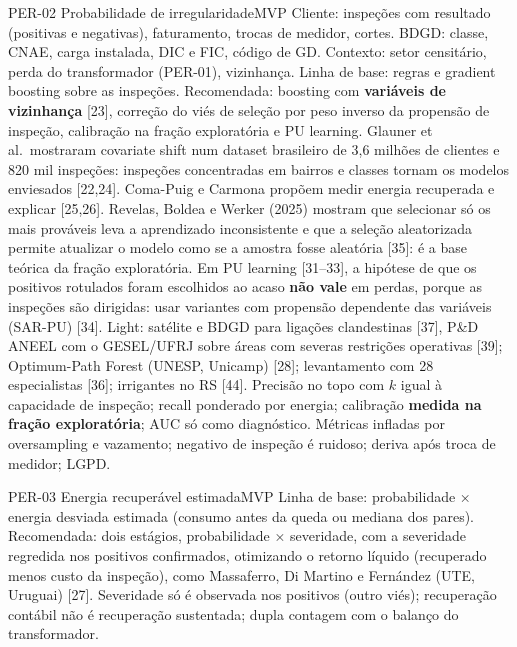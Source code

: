 \begin{ficha}{PER-02 \textperiodcentered{} Probabilidade de irregularidade}{MVP}
 Cliente: inspeções com resultado (positivas e negativas),
faturamento, trocas de medidor, cortes. BDGD: classe, CNAE, carga instalada,
DIC e FIC, código de GD. Contexto: setor censitário, perda do transformador
(PER-01), vizinhança.
 Linha de base: regras e gradient boosting sobre as
inspeções. Recomendada: boosting com \textbf{variáveis de vizinhança} [23],
correção do viés de seleção por peso inverso da propensão de inspeção,
calibração na fração exploratória e PU learning.
 Glauner et al.\ mostraram covariate shift num
dataset brasileiro de 3,6 milhões de clientes e 820 mil inspeções: inspeções
concentradas em bairros e classes tornam os modelos enviesados [22,24].
Coma-Puig e Carmona propõem medir energia recuperada e explicar [25,26].
Revelas, Boldea e Werker (2025) mostram que selecionar só os mais prováveis
leva a aprendizado inconsistente e que a seleção aleatorizada permite
atualizar o modelo como se a amostra fosse aleatória [35]: é a base teórica
da fração exploratória. Em PU learning [31--33], a hipótese de que os
positivos rotulados foram escolhidos ao acaso \textbf{não vale} em perdas,
porque as inspeções são dirigidas: usar variantes com propensão dependente
das variáveis (SAR-PU) [34].
 Light: satélite e BDGD para ligações clandestinas
[37], P\&D ANEEL com o GESEL/UFRJ sobre áreas com severas restrições
operativas [39]; Optimum-Path Forest (UNESP, Unicamp) [28]; levantamento com
28 especialistas [36]; irrigantes no RS [44].
 Precisão no topo com $k$ igual à capacidade de inspeção;
recall ponderado por energia; calibração \textbf{medida na fração
exploratória}; AUC só como diagnóstico.
 Métricas infladas por oversampling e vazamento; negativo
de inspeção é ruidoso; deriva após troca de medidor; LGPD.
\end{ficha}

\begin{ficha}{PER-03 \textperiodcentered{} Energia recuperável estimada}{MVP}
 Linha de base: probabilidade × energia desviada estimada
(consumo antes da queda ou mediana dos pares). Recomendada: dois estágios,
probabilidade × severidade, com a severidade regredida nos positivos
confirmados, otimizando o retorno líquido (recuperado menos custo da
inspeção), como Massaferro, Di Martino e Fernández (UTE, Uruguai) [27].
 Severidade só é observada nos positivos (outro viés);
recuperação contábil não é recuperação sustentada; dupla contagem com o
balanço do transformador.
\end{ficha}

